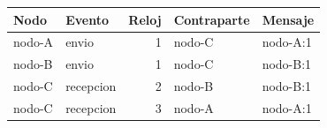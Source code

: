 \small\setlength{\tabcolsep}{4pt}
\begin{tabular}{llrll}
\toprule
Nodo & Evento & Reloj & Contraparte & Mensaje \\
\midrule
nodo-A & envio & 1 & nodo-C & nodo-A:1 \\
nodo-B & envio & 1 & nodo-C & nodo-B:1 \\
nodo-C & recepcion & 2 & nodo-B & nodo-B:1 \\
nodo-C & recepcion & 3 & nodo-A & nodo-A:1 \\
\bottomrule
\end{tabular}
